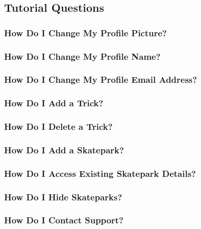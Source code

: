 \subsection{Tutorial Questions}

\subsubsection{How Do I Change My Profile Picture?}

\subsubsection{How Do I Change My Profile Name?}

\subsubsection{How Do I Change My Profile Email Address?}

\subsubsection{How Do I Add a Trick?}

\subsubsection{How Do I Delete a Trick?}

\subsubsection{How Do I Add a Skatepark?}

\subsubsection{How Do I Access Existing Skatepark Details?}

\subsubsection{How Do I Hide Skateparks?} %




\subsubsection{How Do I Contact Support?}

